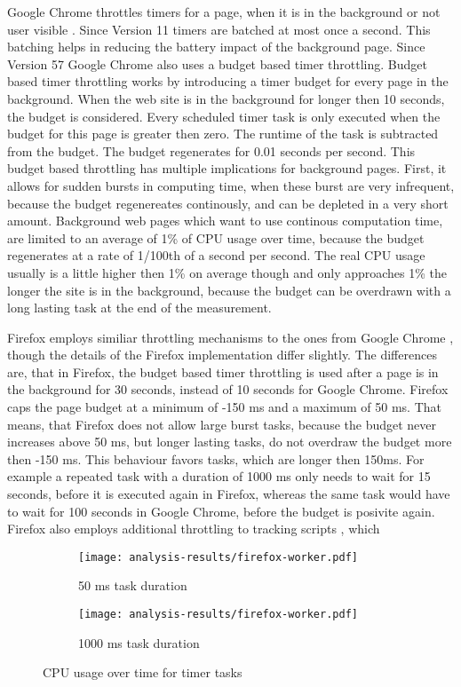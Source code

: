 \documentclass[article,type=bsc,colorback,accentcolor=tud9c]{tudthesis}
\begin{document}
  Google Chrome throttles timers for a page, when it is in the background or not user visible \cite{chrome-background-tabs}. Since Version 11 timers are batched at most once a second. This batching helps in reducing the battery impact of the background page. Since Version 57 Google Chrome also uses a budget based timer throttling. Budget based timer throttling works by introducing a timer budget for every page in the background. When the web site is in the background for longer then 10 seconds, the budget is considered. Every scheduled timer task is only executed when the budget for this page is greater then zero. The runtime of the task is subtracted from the budget. The budget regenerates for 0.01 seconds per second. This budget based throttling has multiple implications for background pages. First, it allows for sudden bursts in computing time, when these burst are very infrequent, because the budget regenereates continously, and can be depleted in a very short amount. Background web pages which want to use continous computation time, are limited to an average of 1\% of CPU usage over time, because the budget regenerates at a rate of 1/100th of a second per second. The real CPU usage usually is a little higher then 1\% on average though and only approaches 1\% the longer the site is in the background, because the budget can be overdrawn with a long lasting task at the end of the measurement.

  Firefox employs similiar throttling mechanisms to the ones from Google Chrome \cite{mdn-page-visibility}, though the details of the Firefox implementation differ slightly. The differences are, that in Firefox, the budget based timer throttling is used after a page is in the background for 30 seconds, instead of 10 seconds for Google Chrome. Firefox caps the page budget at a minimum of -150 ms and a maximum of 50 ms. That means, that Firefox does not allow large burst tasks, because the budget never increases above 50 ms, but longer lasting tasks, do not overdraw the budget more then -150 ms. This behaviour favors tasks, which are longer then 150ms. For example a repeated task with a duration of 1000 ms only needs to wait for 15 seconds, before it is executed again in Firefox, whereas the same task would have to wait for 100 seconds in Google Chrome, before the budget is posivite again. Firefox also employs additional throttling to tracking scripts \cite{mdn-tracker-throttling}, which 
  
  \begin{figure}
    \begin{subfigure}[t]{0.5\textwidth}
      \texttt{[image: analysis-results/firefox-worker.pdf]}
      \caption{50 ms task duration}
    \end{subfigure}
    \hfill
    \begin{subfigure}[t]{0.5\textwidth}
      \texttt{[image: analysis-results/firefox-worker.pdf]}
      \caption{1000 ms task duration}
    \end{subfigure}

    \caption{CPU usage over time for timer tasks}
  \end{figure}
 
\end{document}
